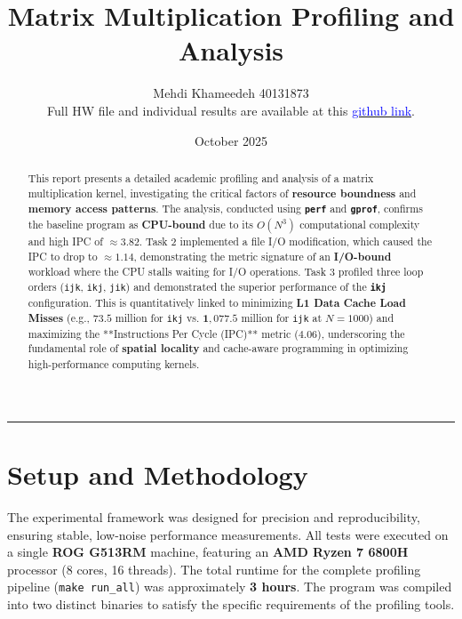 \documentclass[11pt, a4paper]{article}
\title{Matrix Multiplication Profiling and Analysis}
\author{Mehdi Khameedeh 40131873\\Full HW file and individual results are available at this \href{https://github.com/Khameedeh/GPU-programming-Fall2025/tree/main/homeworks/homework-1/problem-2}{\textcolor{blue}{github link}}.}
\date{October 2025}
\begin{document}
\maketitle
\thispagestyle{empty}

\vspace{0.5cm} %

\begin{abstract}
This report presents a detailed academic profiling and analysis of a matrix multiplication kernel, investigating the critical factors of \textbf{resource boundness} and \textbf{memory access patterns}. The analysis, conducted using \textbf{\texttt{perf}} and \textbf{\texttt{gprof}}, confirms the baseline program as \textbf{CPU-bound} due to its $O(N^3)$ computational complexity and high IPC of $\approx 3.82$. Task 2 implemented a file I/O modification, which caused the IPC to drop to $\approx 1.14$, demonstrating the metric signature of an \textbf{I/O-bound} workload where the CPU stalls waiting for I/O operations. Task 3 profiled three loop orders (\texttt{ijk}, \texttt{ikj}, \texttt{jik}) and demonstrated the superior performance of the \textbf{\texttt{ikj}} configuration. This is quantitatively linked to minimizing \textbf{L1 Data Cache Load Misses} (e.g., $\mathbf{73.5}$ million for \texttt{ikj} vs. $\mathbf{1,077.5}$ million for \texttt{ijk} at $N=1000$) and maximizing the **Instructions Per Cycle (IPC)** metric ($\mathbf{4.06}$), underscoring the fundamental role of \textbf{spatial locality} and cache-aware programming in optimizing high-performance computing kernels.
\end{abstract}

\hrule %
\vspace{0.3cm} %


\section{Setup and Methodology}
The experimental framework was designed for precision and reproducibility, ensuring stable, low-noise performance measurements. All tests were executed on a single \textbf{ROG G513RM} machine, featuring an \textbf{AMD Ryzen 7 6800H} processor (8 cores, 16 threads). The total runtime for the complete profiling pipeline (\texttt{make run\_all}) was approximately \textbf{3 hours}. The program was compiled into two distinct binaries to satisfy the specific requirements of the profiling tools.
\end{document}
